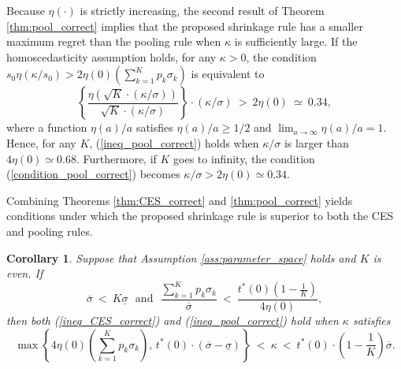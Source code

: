 \documentclass[12pt,a4paper]{article}
\newtheorem{Corollary}{Corollary}
\begin{document}
Because $\eta(\cdot)$ is strictly increasing, the second result of Theorem \ref{thm:pool_correct} implies that the proposed shrinkage rule has a smaller maximum regret than the pooling rule when $\kappa$ is sufficiently large. If the homoscedasticity assumption holds, for any $\kappa > 0$, the condition $s_0 \eta(\kappa/s_0) > 2\eta(0) \left( \sum_{k=1}^K p_k \sigma_k \right)$ is equivalent to
\begin{equation}
\left\{ \frac{\eta\left( \sqrt{K} \cdot (\kappa / \sigma) \right)}{\sqrt{K} \cdot (\kappa / \sigma)} \right\} \cdot (\kappa / \sigma) \ > \ 2 \eta(0) \ \simeq \ 0.34, \label{condition_pool_correct}
\end{equation}
where a function $\eta(a)/a$ satisfies $\eta(a)/a \geq 1/2$ and $\lim_{a \to \infty} \eta(a)/a = 1$. Hence, for any $K$, (\ref{ineq_pool_correct}) holds when $\kappa / \sigma$ is larger than $4 \eta(0) \simeq 0.68$. Furthermore, if $K$ goes to infinity, the condition (\ref{condition_pool_correct}) becomes $\kappa / \sigma > 2 \eta(0) \simeq 0.34$.

Combining Theorems \ref{thm:CES_correct} and \ref{thm:pool_correct} yields conditions under which the proposed shrinkage rule is superior to both the CES and pooling rules.

\begin{Corollary}\label{cor:dominate}
Suppose that Assumption \ref{ass:parameter_space} holds and $K$ is even. If
\begin{equation}
\overline{\sigma} \ < \ K \underline{\sigma} \ \ \ \text{and} \ \ \  \frac{\sum_{k=1}^K p_k \sigma_k}{\overline{\sigma}} \ < \ \frac{t^{\ast}(0) \left( 1- \frac{1}{K} \right)}{4 \eta(0)}, \label{cor_condition}
\end{equation}
then both (\ref{ineq_CES_correct}) and (\ref{ineq_pool_correct}) hold when $\kappa$ satisfies
\begin{equation}
\max \left\{ 4 \eta(0) \left( \sum_{k=1}^K p_k \sigma_k \right), \, t^{\ast}(0) \cdot \left( \overline{\sigma} - \underline{\sigma} \right)  \right\} \ < \ \kappa \ < \ t^{\ast}(0) \cdot \left( 1 - \frac{1}{K} \right) \overline{\sigma}. \label{range_dominate}
\end{equation}
\end{Corollary}
\end{document}
